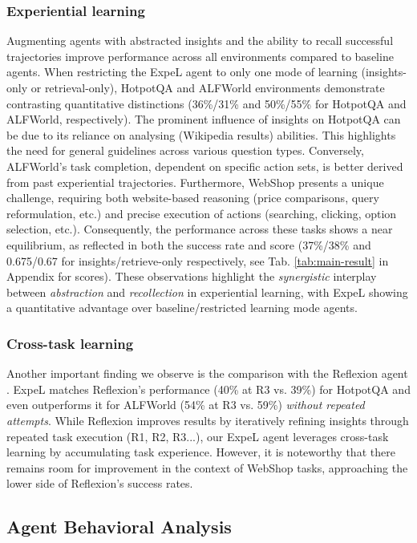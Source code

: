 \documentclass[letterpaper]{article} %
\begin{document}
\subsubsection{Experiential learning}
Augmenting agents with abstracted insights and the ability to recall successful trajectories improve performance across all environments compared to baseline agents. When restricting the ExpeL agent to only one mode of learning (insights-only or retrieval-only), HotpotQA and ALFWorld environments demonstrate contrasting quantitative distinctions (36\%/31\% and 50\%/55\% for HotpotQA and ALFWorld, respectively). The prominent influence of insights on HotpotQA can be due to its reliance on analysing (Wikipedia results) abilities. This highlights the need for general guidelines across various question types. Conversely, ALFWorld's task completion, dependent on specific action sets, is better derived from past experiential trajectories. Furthermore, WebShop presents a unique challenge, requiring both website-based reasoning (price comparisons, query reformulation, etc.) and precise execution of actions (searching, clicking, option selection, etc.). Consequently, the performance across these tasks shows a near equilibrium, as reflected in both the success rate and score (37\%/38\% and 0.675/0.67 for insights/retrieve-only respectively, see Tab. \ref{tab:main-result} in Appendix for scores). These observations highlight the \textit{synergistic} interplay between \textit{abstraction} and \textit{recollection} in experiential learning, with ExpeL showing a quantitative advantage over baseline/restricted learning mode agents.

\subsubsection{Cross-task learning}
Another important finding we observe is the comparison with the Reflexion agent \cite{shinn2023reflexion}. ExpeL matches Reflexion's performance (40\% at R3 vs. 39\%) for HotpotQA and even outperforms it for ALFWorld (54\% at R3 vs. 59\%) \textit{without repeated attempts}. While Reflexion improves results by iteratively refining insights through repeated task execution (R1, R2, R3...), our ExpeL agent leverages cross-task learning by accumulating task experience. However, it is noteworthy that there remains room for improvement in the context of WebShop tasks, approaching the lower side of Reflexion's success rates.

\subsection{Agent Behavioral Analysis}
\label{sec:emergent}
\end{document}
